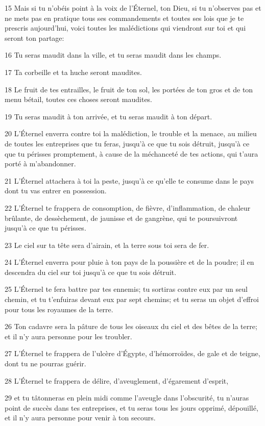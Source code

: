 \par 15 Mais si tu n'obéis point à la voix de l'Éternel, ton Dieu, si tu n'observes pas et ne mets pas en pratique tous ses commandements et toutes ses lois que je te prescris aujourd'hui, voici toutes les malédictions qui viendront sur toi et qui seront ton partage:
\par 16 Tu seras maudit dans la ville, et tu seras maudit dans les champs.
\par 17 Ta corbeille et ta huche seront maudites.
\par 18 Le fruit de tes entrailles, le fruit de ton sol, les portées de ton gros et de ton menu bétail, toutes ces choses seront maudites.
\par 19 Tu seras maudit à ton arrivée, et tu seras maudit à ton départ.
\par 20 L'Éternel enverra contre toi la malédiction, le trouble et la menace, au milieu de toutes les entreprises que tu feras, jusqu'à ce que tu sois détruit, jusqu'à ce que tu périsses promptement, à cause de la méchanceté de tes actions, qui t'aura porté à m'abandonner.
\par 21 L'Éternel attachera à toi la peste, jusqu'à ce qu'elle te consume dans le pays dont tu vas entrer en possession.
\par 22 L'Éternel te frappera de consomption, de fièvre, d'inflammation, de chaleur brûlante, de dessèchement, de jaunisse et de gangrène, qui te poursuivront jusqu'à ce que tu périsses.
\par 23 Le ciel sur ta tête sera d'airain, et la terre sous toi sera de fer.
\par 24 L'Éternel enverra pour pluie à ton pays de la poussière et de la poudre; il en descendra du ciel sur toi jusqu'à ce que tu sois détruit.
\par 25 L'Éternel te fera battre par tes ennemis; tu sortiras contre eux par un seul chemin, et tu t'enfuiras devant eux par sept chemins; et tu seras un objet d'effroi pour tous les royaumes de la terre.
\par 26 Ton cadavre sera la pâture de tous les oiseaux du ciel et des bêtes de la terre; et il n'y aura personne pour les troubler.
\par 27 L'Éternel te frappera de l'ulcère d'Égypte, d'hémorroïdes, de gale et de teigne, dont tu ne pourras guérir.
\par 28 L'Éternel te frappera de délire, d'aveuglement, d'égarement d'esprit,
\par 29 et tu tâtonneras en plein midi comme l'aveugle dans l'obscurité, tu n'auras point de succès dans tes entreprises, et tu seras tous les jours opprimé, dépouillé, et il n'y aura personne pour venir à ton secours.
